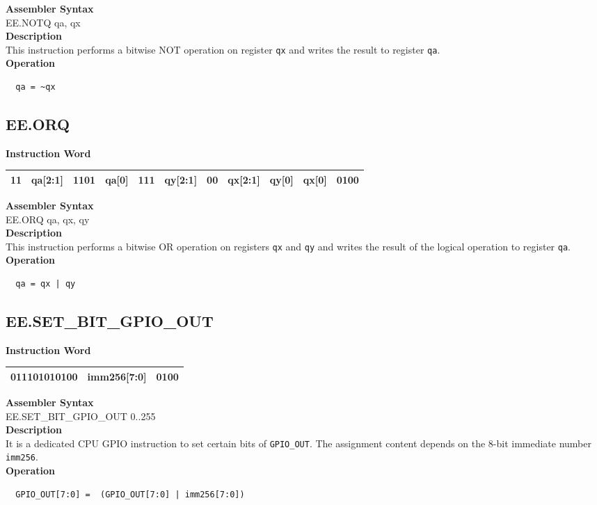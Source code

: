 \textbf{Assembler Syntax} \\
EE.NOTQ qa, qx \\
\textbf{Description} \\
This instruction performs a bitwise NOT operation on register \lstinline{qx} and writes the result to register \lstinline{qa}.\\
\textbf{Operation}
\begin{lstlisting}
  qa = ~qx
\end{lstlisting}

\clearpage
\subsection{EE.ORQ}\label{instruction:EEORQ}
\setlength\tabcolsep{6pt}
\textbf{Instruction Word} \\
\begin{tabular}{|c|c|c|c|c|c|c|c|c|c|c|}
	\hline
	11 & qa[2:1] & 1101 & qa[0] & 111 & qy[2:1] & 00 & qx[2:1] & qy[0] & qx[0] & 0100 \\
	\hline
\end{tabular}

\textbf{Assembler Syntax} \\
EE.ORQ qa, qx, qy \\
\textbf{Description} \\
This instruction performs a bitwise OR operation on registers \lstinline{qx} and \lstinline{qy} and writes the result of the logical operation to register \lstinline{qa}.\\
\textbf{Operation}
\begin{lstlisting}
  qa = qx | qy
\end{lstlisting}

\clearpage
\subsection{EE.SET\_BIT\_GPIO\_OUT}\label{instruction:EESETBITGPIOOUT}
\setlength\tabcolsep{6pt}
\textbf{Instruction Word} \\
\begin{tabular}{|c|c|c|}
	\hline
	011101010100 & imm256[7:0] & 0100 \\
	\hline
\end{tabular}

\textbf{Assembler Syntax} \\
EE.SET\_BIT\_GPIO\_OUT 0..255 \\
\textbf{Description} \\
It is a dedicated CPU GPIO instruction to set certain bits of \lstinline{GPIO_OUT}. The assignment content depends on the 8-bit immediate number \lstinline{imm256}.\\
\textbf{Operation}
\begin{lstlisting}
  GPIO_OUT[7:0] =  (GPIO_OUT[7:0] | imm256[7:0])
\end{lstlisting}

